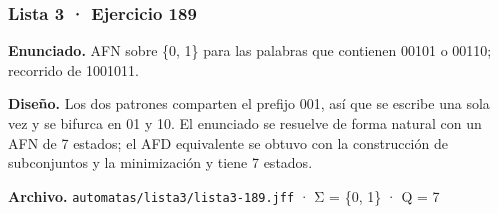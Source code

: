 
\hypertarget{lista-3-ejercicio-189}{%
\subsubsection{Lista 3 · Ejercicio 189}\label{lista-3-ejercicio-189}}

\textbf{Enunciado.} AFN sobre \{0, 1\} para las palabras que contienen 00101 o 00110; recorrido de 1001011.

\textbf{Diseño.} Los dos patrones comparten el prefijo 001, así que se escribe una sola vez y se bifurca en 01 y 10. El enunciado se resuelve de forma natural con un AFN de 7 estados; el AFD equivalente se obtuvo con la construcción de subconjuntos y la minimización y tiene 7 estados.

\textbf{Archivo.} \texttt{automatas/lista3/lista3-189.jff} · Σ = \{0, 1\} · \textbar Q\textbar{} = 7

